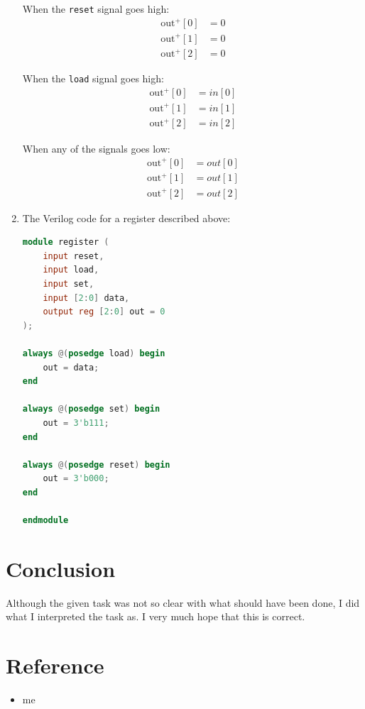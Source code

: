 \documentclass{article}
\begin{document}
\begin{enumerate}
{            When the \verb|reset| signal goes high:
            \begin{displaymath}
                \begin{aligned}
                    \text{out}^+[0] &= 0 \\
                    \text{out}^+[1] &= 0 \\
                    \text{out}^+[2] &= 0
                \end{aligned}
            \end{displaymath}

            When the \verb|load| signal goes high:
            \begin{displaymath}
                \begin{aligned}
                    \text{out}^+[0] &= in[0] \\
                    \text{out}^+[1] &= in[1] \\
                    \text{out}^+[2] &= in[2]
                \end{aligned}
            \end{displaymath}

            When any of the signals goes low:
            \begin{displaymath}
                \begin{aligned}
                    \text{out}^+[0] &= out[0] \\
                    \text{out}^+[1] &= out[1] \\
                    \text{out}^+[2] &= out[2]
                \end{aligned}
            \end{displaymath}
        }
        \item {
            The Verilog code for a register described above:
            
            \begin{lstlisting}[language=verilog]
module register (
    input reset,
    input load,
    input set,
    input [2:0] data,
    output reg [2:0] out = 0
);

always @(posedge load) begin
    out = data;
end

always @(posedge set) begin
    out = 3'b111;
end

always @(posedge reset) begin
    out = 3'b000;
end

endmodule\end{lstlisting}
        }
    \end{enumerate}

    \section*{Conclusion}

    Although the given task was not so clear with what should have been done, I did what I interpreted the task as. I very much hope that this is correct.

    \section*{Reference}
    
    \begin{itemize}
        \item me
    \end{itemize}
\end{document}
